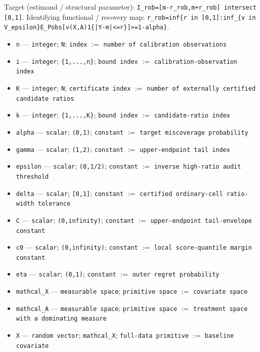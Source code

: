 \documentclass{article}
\begin{document}
Target (estimand / structural parameter): \texttt{I\_rob=[m-r\_rob,m+r\_rob] intersect [0,1]}.
Identifying functional / recovery map: \texttt{r\_rob=inf\{r in [0,1]:inf\_\{v in V\_epsilon\}E\_Pobs[v(X,A)1\{|Y-m|<=r\}]>=1-alpha\}}.
\begin{itemize}
  \item \texttt{n} --- \texttt{integer}; \texttt{N}; \texttt{index} $:=$ \texttt{number of calibration observations}
  \item \texttt{i} --- \texttt{integer}; \texttt{\{1,...,n\}}; \texttt{bound index} $:=$ \texttt{calibration-observation index}
  \item \texttt{K} --- \texttt{integer}; \texttt{N}; \texttt{certificate index} $:=$ \texttt{number of externally certified candidate ratios}
  \item \texttt{k} --- \texttt{integer}; \texttt{\{1,...,K\}}; \texttt{bound index} $:=$ \texttt{candidate-ratio index}
  \item \texttt{alpha} --- \texttt{scalar}; \texttt{(0,1)}; \texttt{constant} $:=$ \texttt{target miscoverage probability}
  \item \texttt{gamma} --- \texttt{scalar}; \texttt{(1,2)}; \texttt{constant} $:=$ \texttt{upper-endpoint tail index}
  \item \texttt{epsilon} --- \texttt{scalar}; \texttt{(0,1/2)}; \texttt{constant} $:=$ \texttt{inverse high-ratio audit threshold}
  \item \texttt{delta} --- \texttt{scalar}; \texttt{[0,1]}; \texttt{constant} $:=$ \texttt{certified ordinary-cell ratio-width tolerance}
  \item \texttt{C} --- \texttt{scalar}; \texttt{(0,infinity)}; \texttt{constant} $:=$ \texttt{upper-endpoint tail-envelope constant}
  \item \texttt{c0} --- \texttt{scalar}; \texttt{(0,infinity)}; \texttt{constant} $:=$ \texttt{local score-quantile margin constant}
  \item \texttt{eta} --- \texttt{scalar}; \texttt{(0,1)}; \texttt{constant} $:=$ \texttt{outer regret probability}
  \item \texttt{mathcal\_X} --- \texttt{measurable space}; \texttt{primitive space} $:=$ \texttt{covariate space}
  \item \texttt{mathcal\_A} --- \texttt{measurable space}; \texttt{primitive space} $:=$ \texttt{treatment space with a dominating measure}
  \item \texttt{X} --- \texttt{random vector}; \texttt{mathcal\_X}; \texttt{full-data primitive} $:=$ \texttt{baseline covariate}

\end{itemize}
\end{document}
